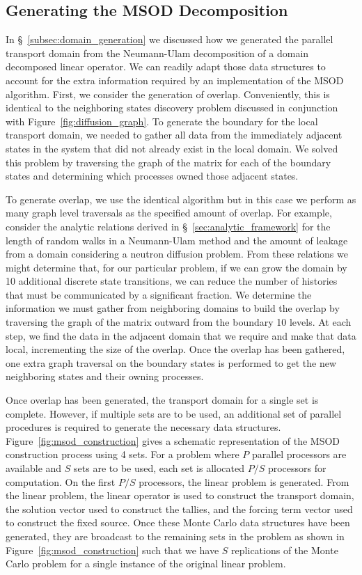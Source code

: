 \subsection{Generating the MSOD Decomposition }
\label{subsec:msod_generation}
In \S~\ref{subsec:domain_generation} we discussed how we generated the
parallel transport domain from the Neumann-Ulam decomposition of a
domain decomposed linear operator. We can readily adapt those data
structures to account for the extra information required by an
implementation of the MSOD algorithm. First, we consider the
generation of overlap. Conveniently, this is identical to the
neighboring states discovery problem discussed in conjunction with
Figure~\ref{fig:diffusion_graph}. To generate the boundary for the
local transport domain, we needed to gather all data from the
immediately adjacent states in the system that did not already exist
in the local domain. We solved this problem by traversing the graph
of the matrix for each of the boundary states and determining which
processes owned those adjacent states. 

To generate overlap, we use the identical algorithm but in this case
we perform as many graph level traversals as the specified amount of
overlap. For example, consider the analytic relations derived in
\S~\ref{sec:analytic_framework} for the length of random walks in a
Neumann-Ulam method and the amount of leakage from a domain
considering a neutron diffusion problem. From these relations we might
determine that, for our particular problem, if we can grow the domain
by 10 additional discrete state transitions, we can reduce the number
of histories that must be communicated by a significant fraction. We
determine the information we must gather from neighboring domains to
build the overlap by traversing the graph of the matrix outward from
the boundary 10 levels. At each step, we find the data in the adjacent
domain that we require and make that data local, incrementing the size
of the overlap. Once the overlap has been gathered, one extra graph
traversal on the boundary states is performed to get the new
neighboring states and their owning processes.

Once overlap has been generated, the transport domain for a single set
is complete. However, if multiple sets are to be used, an additional
set of parallel procedures is required to generate the necessary data
structures. Figure~\ref{fig:msod_construction} gives a schematic
representation of the MSOD construction process using 4 sets. For a
problem where $P$ parallel processors are available and $S$ sets are
to be used, each set is allocated $P/S$ processors for computation. On
the first $P/S$ processors, the linear problem is generated. From the
linear problem, the linear operator is used to construct the transport
domain, the solution vector used to construct the tallies, and the
forcing term vector used to construct the fixed source. Once these
Monte Carlo data structures have been generated, they are broadcast to
the remaining sets in the problem as shown in
Figure~\ref{fig:msod_construction} such that we have $S$ replications
of the Monte Carlo problem for a single instance of the original
linear problem.

